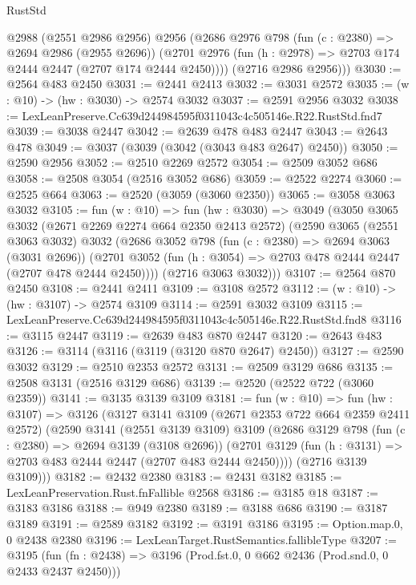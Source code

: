 \begin{lexlean}{RustStd}
\begin{coremodule}
        @2988
        (@2551 @2986 @2956)
        @2956
        (@2686
          @2976
          @798
          (fun (c : @2380) => @2694 @2986 (@2955 @2696))
          (@2701 @2976 (fun (h : @2978) => @2703 @174 @2444 @2447 (@2707 @174 @2444 @2450))))
        (@2716 @2986 @2956)))
@3030 := @2564 @483 @2450
@3031 := @2441 @2413
@3032 := @3031 @2572
@3035 := (w : @10) -> (hw : @3030) -> @2574 @3032
@3037 := @2591 @2956 @3032
@3038 := LexLeanPreserve.Cc639d244984595f0311043c4c505146e.R22.RustStd.fnd7
@3039 := @3038 @2447
@3042 := @2639 @478 @483 @2447
@3043 := @2643 @478
@3049 := @3037 (@3039 (@3042 (@3043 @483 @2647) @2450))
@3050 := @2590 @2956
@3052 := @2510 @2269 @2572
@3054 := @2509 @3052 @686
@3058 := @2508 @3054 (@2516 @3052 @686)
@3059 := @2522 @2274
@3060 := @2525 @664
@3063 := @2520 (@3059 (@3060 @2350))
@3065 := @3058 @3063 @3032
@3105 := fun (w : @10) =>
  fun (hw : @3030) =>
  @3049
    (@3050
      @3065
      @3032
      (@2671 @2269 @2274 @664 @2350 @2413 @2572)
      (@2590
        @3065
        (@2551 @3063 @3032)
        @3032
        (@2686
          @3052
          @798
          (fun (c : @2380) => @2694 @3063 (@3031 @2696))
          (@2701 @3052 (fun (h : @3054) => @2703 @478 @2444 @2447 (@2707 @478 @2444 @2450))))
        (@2716 @3063 @3032)))
@3107 := @2564 @870 @2450
@3108 := @2441 @2411
@3109 := @3108 @2572
@3112 := (w : @10) -> (hw : @3107) -> @2574 @3109
@3114 := @2591 @3032 @3109
@3115 := LexLeanPreserve.Cc639d244984595f0311043c4c505146e.R22.RustStd.fnd8
@3116 := @3115 @2447
@3119 := @2639 @483 @870 @2447
@3120 := @2643 @483
@3126 := @3114 (@3116 (@3119 (@3120 @870 @2647) @2450))
@3127 := @2590 @3032
@3129 := @2510 @2353 @2572
@3131 := @2509 @3129 @686
@3135 := @2508 @3131 (@2516 @3129 @686)
@3139 := @2520 (@2522 @722 (@3060 @2359))
@3141 := @3135 @3139 @3109
@3181 := fun (w : @10) =>
  fun (hw : @3107) =>
  @3126
    (@3127
      @3141
      @3109
      (@2671 @2353 @722 @664 @2359 @2411 @2572)
      (@2590
        @3141
        (@2551 @3139 @3109)
        @3109
        (@2686
          @3129
          @798
          (fun (c : @2380) => @2694 @3139 (@3108 @2696))
          (@2701 @3129 (fun (h : @3131) => @2703 @483 @2444 @2447 (@2707 @483 @2444 @2450))))
        (@2716 @3139 @3109)))
@3182 := @2432 @2380
@3183 := @2431 @3182
@3185 := LexLeanPreservation.Rust.fnFallible @2568
@3186 := @3185 @18
@3187 := @3183 @3186
@3188 := @949 @2380
@3189 := @3188 @686
@3190 := @3187 @3189
@3191 := @2589 @3182
@3192 := @3191 @3186
@3195 := Option.map.{0, 0} @2438 @2380
@3196 := LexLeanTarget.RustSemantics.fallibleType
@3207 := @3195
    (fun (fn : @2438) => @3196 (Prod.fst.{0, 0} @662 @2436 (Prod.snd.{0, 0} @2433 @2437 @2450)))

\end{coremodule}
\end{lexlean}

